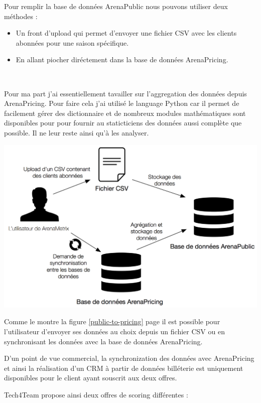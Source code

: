 Pour remplir la base de données ArenaPublic nous pouvons utiliser deux méthodes : 
\begin{itemize}
  \item[\textbullet] Un front d'upload qui permet d'envoyer une fichier CSV avec les clients abonnées pour une saison spécifique.
  \item[\textbullet] En allant piocher diréctement dans la base de données ArenaPricing.
  \end{itemize} \
 
Pour ma part j'ai essentiellement tavailler sur l'aggregation des données depuis ArenaPricing. 
Pour faire cela j'ai utilisé le language Python car il permet de facilement gérer des dictionnaire et de nombreux modules mathématiques sont disponibles pour pour fournir au staticticiens des données aussi complète que possible. Il ne leur reste ainsi qu'à les analyser. 

\begin{center}
\includegraphics[scale=0.7]{images/public-to-pricing.png}
\label{public-to-pricing}
\end{center}

Comme le montre la figure \ref{public-to-pricing} page \pageref{public-to-pricing} il est possible pour l'utilisateur d'envoyer ses données au choix depuis un fichier CSV ou en synchronisant les données avec la base de données ArenaPricing. 

D'un point de vue commercial, la synchronization des données avec ArenaPricing et ainsi la réalisation d'un CRM à partir de données billéterie est uniquement disponibles pour le client ayant souscrit aux deux offres. 

Tech4Team propose ainsi deux offres de scoring différentes : 

